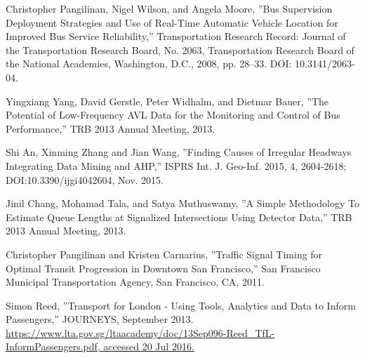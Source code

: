 \documentclass[12pt]{report}
\begin{document}
\begin{thebibliography}{14}
Christopher Pangilinan, Nigel Wilson, and Angela Moore, ''Bus Supervision Deployment Strategies and Use of Real-Time Automatic
Vehicle Location for Improved Bus Service Reliability,'' Transportation Research Record: Journal of the Transportation Research Board, No. 2063, Transportation Research Board of the National Academies, Washington, D.C., 2008, pp. 28–33. DOI: 10.3141/2063-04.

Yingxiang Yang, David Gerstle, Peter Widhalm, and Dietmar Bauer, ''The Potential of Low-Frequency AVL Data for the Monitoring and Control of Bus Performance,'' TRB 2013 Annual Meeting, 2013.

Shi An, Xinming Zhang and Jian Wang, ''Finding Causes of Irregular Headways Integrating Data Mining and AHP,'' ISPRS Int. J. Geo-Inf. 2015, 4, 2604-2618; DOI:10.3390/ijgi4042604, Nov. 2015.

Jinil Chang, Mohamad Tala, and Satya Muthuswamy, ''A Simple Methodology To Estimate Queue Lengths at Signalized Intersections Using Detector Data,'' TRB 2013 Annual Meeting, 2013.

Christopher Pangilinan and Kristen Carnarius, ''Traffic Signal Timing for Optimal Transit Progression in Downtown San Francisco,'' San Francisco Municipal Transportation Agency, San Francisco, CA, 2011.

Simon Reed, ''Transport for London - Using Tools, Analytics and Data to Inform Passengers,'' JOURNEYS, September 2013. \url{https://www.lta.gov.sg/ltaacademy/doc/13Sep096-Reed_TfL-InformPassengers.pdf, accessed 20 Jul 2016.}





\end{thebibliography}
\end{document}
